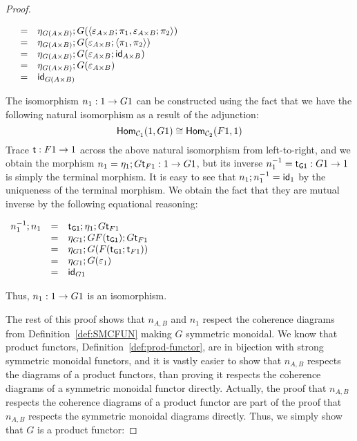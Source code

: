 \begin{proof}
\begin{center}
\begin{math}
\begin{array}{lll}
        & = & \eta_{G(A \times B)};G(\langle \varepsilon_{A \times B};\pi_1, \varepsilon_{A \times B};\pi_2 \rangle)\\
        & = & \eta_{G(A \times B)};G(\varepsilon_{A \times B};\langle \pi_1, \pi_2 \rangle)\\
        & = & \eta_{G(A \times B)};G(\varepsilon_{A \times B};\mathsf{id}_{A \times B})\\
        & = & \eta_{G(A \times B)};G(\varepsilon_{A \times B})\\
        & = & \mathsf{id}_{G(A \times B)}
      \end{array}
    \end{math}
  \end{center}

  The isomorphism $n_1 : 1 \rightarrow G1$ can be constructed using the fact
  that we have the following natural isomorphism as a result of the
  adjunction:
  \[
  \mathsf{Hom}_{\mathcal{C}_1}(1,G1) \cong \mathsf{Hom}_{\mathcal{C}_2}(F1,1)
  \]
  Trace $\mathsf{t} : F1 \rightarrow 1$ across the above natural isomorphism
  from left-to-right, and we obtain the morphism $n_1 =
  \eta_1;G\mathsf{t}_{F1} : 1 \rightarrow G1$, but its inverse $n^{-1}_1 =
  \mathsf{t_{G1}} : G1 \rightarrow 1$ is simply the terminal morphism.  It is
  easy to see that $n_1;n^{-1}_1 = \mathsf{id}_1$ by the uniqueness of the
  terminal morphism.  We obtain the fact that they are mutual inverse
  by the following equational reasoning:
  \begin{center}
    \begin{math}
      \begin{array}{lll}
        n^{-1}_1;n_1
        & = & \mathsf{t_{G1}};\eta_1;G\mathsf{t}_{F1}\\
        & = & \eta_{G1};GF(\mathsf{t_{G1}});G\mathsf{t}_{F1}\\
        & = & \eta_{G1};G(F(\mathsf{t_{G1}};\mathsf{t}_{F1}))\\
        & = & \eta_{G1};G(\varepsilon_1)\\
        & = & \mathsf{id}_{G1}\\
      \end{array}
    \end{math}
  \end{center}
  Thus, $n_1 : 1 \rightarrow G1$ is an isomorphism.

  The rest of this proof shows that $n_{A,B}$ and $n_1$ respect the
  coherence diagrams from Definition~\ref{def:SMCFUN} making $G$
  symmetric monoidal.  We know that product functors,
  Definition~\ref{def:prod-functor}, are in bijection with strong
  symmetric monoidal functors, and it is vastly easier to show that
  $n_{A,B}$ respects the diagrams of a product functors, than proving
  it respects the coherence diagrams of a symmetric monoidal functor
  directly.  Actually, the proof that $n_{A,B}$ respects the coherence
  diagrams of a product functor are part of the proof that $n_{A,B}$
  respects the symmetric monoidal diagrams directly.  Thus, we simply
  show that $G$ is a product functor:


\end{proof}

